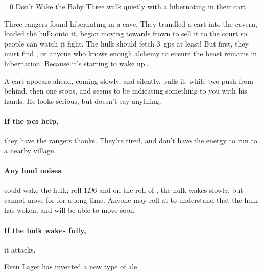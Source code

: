 \ifnum\value{temperature}=0
  {Don't Wake the Baby}%
  {Three  walk quietly with a hibernating  in their cart}%

  Three \glspl{ranger} found  hibernating in a cave.
  They trundled a cart into the cavern, loaded the \gls{hulk} onto it, began moving towards \gls{ftown} to sell it to the \gls{court} so people can watch it fight.
  The \gls{hulk} should fetch 3~\glspl{gp} at least!
  But first, they must find , or anyone who knows enough \gls{alchemy} to ensure the beast remains in hibernation.
  Because it's starting to wake up\ldots

  \begin{boxtext}
    A cart appears ahead, coming slowly, and silently.
     pulls it, while two push from behind, then one stops, and seems to be indicating something to you with his hands.
    He looks serious, but doesn't say anything.
  \end{boxtext}

  \paragraph{If the \glspl{pc} help,}
  they have the \glspl{ranger} thanks.
  They're tired, and don't have the energy to run to a nearby \gls{village}.


  \paragraph{Any loud noises}
  could wake the \gls{hulk}; roll $1D6$ and on the roll of , the \gls{hulk} wakes slowly, but cannot move for for a long time.
  Anyone may roll  at \tn[12] to understand that the \gls{hulk} has woken, and will be able to move soon.

  \paragraph{If the \gls{hulk} wakes fully,}
  it attacks.

  \umberhulk

\fi

{Even Lager}%
{ has invented a new type of ale}%

